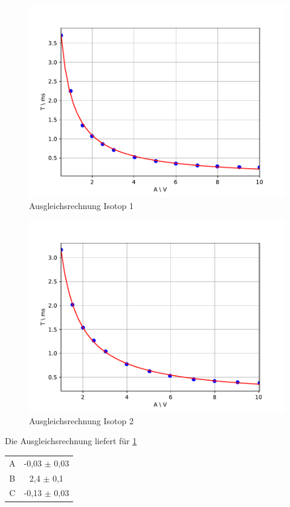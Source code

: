\begin{figure}[h]
\centering
\includegraphics[scale=0.8]{img/trans1.pdf}
\caption{Ausgleichsrechnung Isotop 1}
\label{trans1}
\end{figure}

\begin{figure}[h]
\centering
\includegraphics[scale=0.8]{img/trans2.pdf}
\caption{Ausgleichsrechnung Isotop 2}
\label{trans2}
\end{figure}

Die Ausgleichsrechnung liefert für \ref{trans1}
\begin{table}[h!]
\centering
\begin{tabular}{cc} \toprule
\centering
A & -0,03 $\pm$ 0,03 \\
B & 2,4 $\pm$ 0,1 \\
C & -0,13 $\pm$ 0,03 \\
\bottomrule
\end{tabular}
\end{table}


